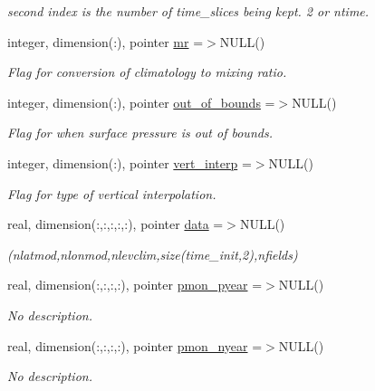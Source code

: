 \begin{DoxyCompactItemize}
\begin{DoxyCompactList}\small\item\em second index is the number of time\+\_\+slices being kept. 2 or ntime. \end{DoxyCompactList}\item 
integer, dimension(\+:), pointer \hyperlink{structinterpolator__mod_1_1interpolate__type_a9f58037b78bd083d1f02b69a7e7951fd}{mr} =$>$N\+U\+LL()
\begin{DoxyCompactList}\small\item\em Flag for conversion of climatology to mixing ratio. \end{DoxyCompactList}\item 
integer, dimension(\+:), pointer \hyperlink{structinterpolator__mod_1_1interpolate__type_a4a8a789a637ebebe856231b397458393}{out\+\_\+of\+\_\+bounds} =$>$N\+U\+LL()
\begin{DoxyCompactList}\small\item\em Flag for when surface pressure is out of bounds. \end{DoxyCompactList}\item 
integer, dimension(\+:), pointer \hyperlink{structinterpolator__mod_1_1interpolate__type_a7257d09acb88219d06e28f21bc05db60}{vert\+\_\+interp} =$>$N\+U\+LL()
\begin{DoxyCompactList}\small\item\em Flag for type of vertical interpolation. \end{DoxyCompactList}\item 
real, dimension(\+:,\+:,\+:,\+:,\+:), pointer \hyperlink{structinterpolator__mod_1_1interpolate__type_ae1ce24a33a1e06060a1033dcd2f433cc}{data} =$>$N\+U\+LL()
\begin{DoxyCompactList}\small\item\em (nlatmod,nlonmod,nlevclim,size(time\+\_\+init,2),nfields) \end{DoxyCompactList}\item 
real, dimension(\+:,\+:,\+:,\+:), pointer \hyperlink{structinterpolator__mod_1_1interpolate__type_ae6916b2c97f2a40660d4c9ab3c476c6f}{pmon\+\_\+pyear} =$>$N\+U\+LL()
\begin{DoxyCompactList}\small\item\em No description. \end{DoxyCompactList}\item 
real, dimension(\+:,\+:,\+:,\+:), pointer \hyperlink{structinterpolator__mod_1_1interpolate__type_a5df101410d4543d33a3bf2743dffdfad}{pmon\+\_\+nyear} =$>$N\+U\+LL()
\begin{DoxyCompactList}\small\item\em No description. \end{DoxyCompactList}\item 

\end{DoxyCompactItemize}
